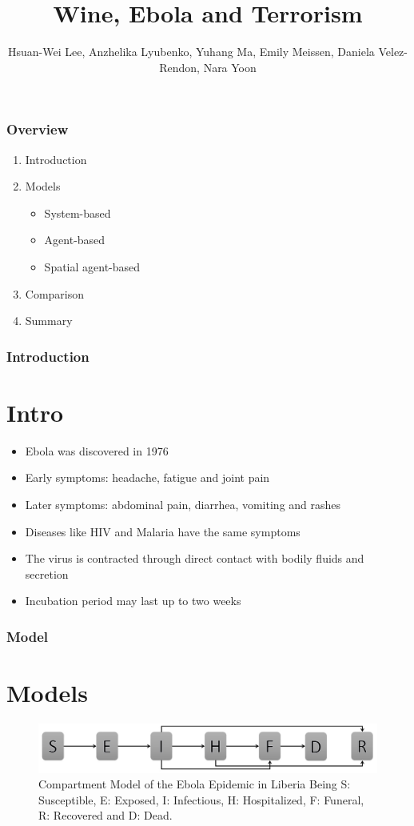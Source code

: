 \documentclass[30pt]{beamer}
\author{ Hsuan-Wei Lee,
  Anzhelika Lyubenko,
  Yuhang Ma,
  Emily Meissen,
  Daniela Velez-Rendon,
    Nara Yoon}
\title[]{Wine, Ebola and Terrorism}
\begin{document}
\begin{frame}[t,plain]
    \titlepage
\end{frame}

\begin{frame}[t,plain]
    \frametitle{Overview}
\begin{enumerate}
\vfill
\item Introduction
\item Models
\begin{itemize}
\item System-based
\item Agent-based
\item Spatial agent-based
\end{itemize}
\item Comparison
\item Summary
\end{enumerate}
\end{frame}

\begin{frame}
\frametitle{Introduction}
\section{Intro}
\begin{itemize}
\item Ebola was discovered in 1976
\item Early symptoms:  headache, fatigue and joint pain
\item Later symptoms: abdominal pain, diarrhea, vomiting and rashes
\item Diseases like HIV and Malaria have the same symptoms
\item The virus is contracted through direct contact with bodily fluids and secretion
\item Incubation period may last up to two weeks
\end{itemize}
\end{frame}




\begin{frame}
\frametitle{Model}
\section{Models}


\begin{figure}[!h]
  \centering
  \includegraphics[width=1\textwidth]{compartmentNoFlow}
  \caption{Compartment Model of the Ebola Epidemic in Liberia \newline  Being S: Susceptible, E: Exposed, I: Infectious, H: Hospitalized, F: Funeral,  R: Recovered and D: Dead. } 
\label{fig:compartment} 
\end{figure}
\end{frame}
\end{document}
